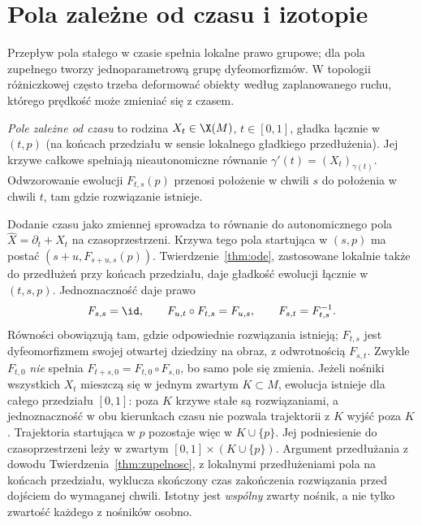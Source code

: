 \section{Pola zależne od czasu i izotopie}
\label{sec:izotopie}

Przepływ pola stałego w czasie spełnia lokalne prawo grupowe;
dla pola zupełnego tworzy jednoparametrową grupę dyfeomorfizmów.
W topologii różniczkowej często trzeba deformować obiekty według
zaplanowanego ruchu, którego prędkość może zmieniać się z czasem.

\begin{definicja}
\emph{Pole zależne od czasu} to rodzina $X_t\in\X(M)$,
$t\in[0,1]$, gładka łącznie w $(t,p)$ (na końcach przedziału
w sensie lokalnego gładkiego przedłużenia). Jej krzywe całkowe spełniają nieautonomiczne równanie
$\gamma'(t)=(X_t)_{\gamma(t)}$. Odwzorowanie ewolucji
$F_{t,s}(p)$ przenosi położenie w chwili $s$ do położenia
w chwili $t$, tam gdzie rozwiązanie istnieje.
\end{definicja}

Dodanie czasu jako zmiennej sprowadza to równanie do autonomicznego
pola $\widehat X=\partial_t+X_t$ na czasoprzestrzeni.
Krzywa tego pola startująca w $(s,p)$ ma postać
$(s+u,F_{s+u,s}(p))$. Twierdzenie~\ref{thm:ode}, zastosowane
lokalnie także do przedłużeń przy końcach przedziału, daje
gładkość ewolucji łącznie w $(t,s,p)$. Jednoznaczność daje prawo
\begin{equation}\label{eq:ewolucja}
 F_{s,s}=\id,\qquad F_{u,t}\circ F_{t,s}=F_{u,s},
 \qquad F_{s,t}=F_{t,s}^{-1}.
\end{equation}
Równości obowiązują tam, gdzie odpowiednie rozwiązania istnieją;
$F_{t,s}$ jest dyfeomorfizmem swojej otwartej dziedziny na obraz,
z odwrotnością $F_{s,t}$.
Zwykle $F_{t,0}$ \emph{nie} spełnia
$F_{t+s,0}=F_{t,0}\circ F_{s,0}$, bo samo pole się zmienia.
Jeżeli nośniki wszystkich $X_t$ mieszczą się w jednym zwartym
$K\subset M$, ewolucja istnieje dla całego przedziału $[0,1]$:
poza $K$ krzywe stałe są rozwiązaniami, a jednoznaczność
w obu kierunkach czasu nie pozwala trajektorii z $K$ wyjść
poza $K$. Trajektoria startująca w $p$ pozostaje więc w
$K\cup\{p\}$. Jej podniesienie do czasoprzestrzeni leży
w zwartym $[0,1]\times(K\cup\{p\})$. Argument przedłużania
z dowodu Twierdzenia~\ref{thm:zupelnosc}, z lokalnymi przedłużeniami
pola na końcach przedziału, wyklucza skończony czas zakończenia
rozwiązania przed dojściem do wymaganej chwili. Istotny jest
\emph{wspólny} zwarty nośnik, a nie tylko zwartość każdego z nośników osobno.

